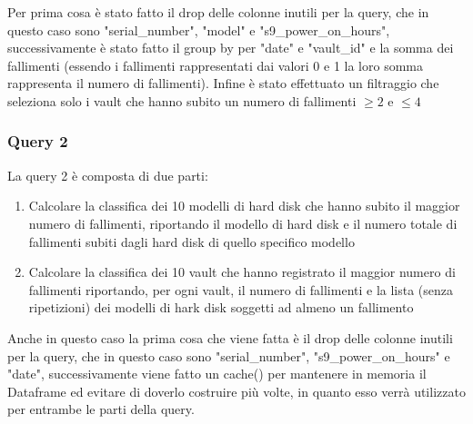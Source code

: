 \documentclass[conference]{IEEEtran}
\begin{document}
Per prima cosa è stato fatto il drop delle colonne inutili per la query, che in questo caso sono "serial\_number", "model" e "s9\_power\_on\_hours", successivamente è stato fatto il group by per "date" e "vault\_id" e la somma dei fallimenti (essendo i fallimenti rappresentati dai valori 0 e 1 la loro somma rappresenta il numero di fallimenti). Infine è stato effettuato un filtraggio che seleziona solo i vault che hanno subito un numero di fallimenti $\geq2$ e $\leq4$ 

\subsubsection{Query 2}
La query 2 è composta di due parti:
\begin{enumerate}
    \item Calcolare la classifica dei 10 modelli di hard disk che hanno subito il maggior numero di fallimenti, riportando il modello di hard disk e il numero totale di fallimenti subiti dagli hard disk di quello specifico modello
    \item Calcolare la classifica dei 10 vault che hanno registrato il maggior numero di
    fallimenti riportando, per ogni vault, il numero di fallimenti e la lista (senza ripetizioni) dei modelli di
    hark disk soggetti ad almeno un fallimento
\end{enumerate}
Anche in questo caso la prima cosa che viene fatta è il drop delle colonne inutili per la query, che in questo caso sono "serial\_number", "s9\_power\_on\_hours" e "date", successivamente viene fatto un cache() per mantenere in memoria il Dataframe ed evitare di doverlo costruire più volte, in quanto esso verrà utilizzato per entrambe le parti della query. 
\end{document}
